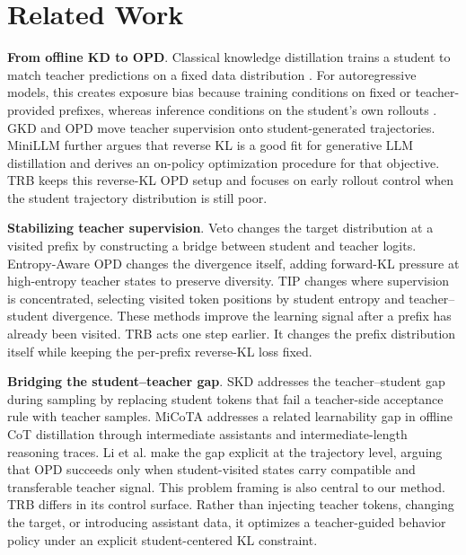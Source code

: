 \documentclass[11pt]{article}
\renewcommand{\paragraph}[1]{\vspace{1mm}\noindent\textbf{#1}.}
\begin{document}
\section{Related Work}
\label{sec:related}

\paragraph{From offline KD to OPD}
Classical knowledge distillation trains a student to match teacher predictions on a fixed data distribution \citep{hinton2015distilling}.
For autoregressive models, this creates exposure bias because training conditions on fixed or teacher-provided prefixes, whereas inference conditions on the student's own rollouts \citep{bengio2015scheduled}.
GKD and OPD \citep{opd} move teacher supervision onto student-generated trajectories.
MiniLLM \citep{gu2023minillm} further argues that reverse KL is a good fit for generative LLM distillation and derives an on-policy optimization procedure for that objective.
TRB keeps this reverse-KL OPD setup and focuses on early rollout control when the student trajectory distribution is still poor.

\paragraph{Stabilizing teacher supervision}
Veto \citep{veto} changes the target distribution at a visited prefix by constructing a bridge between student and teacher logits.
Entropy-Aware OPD \citep{jin2026entropyaware} changes the divergence itself, adding forward-KL pressure at high-entropy teacher states to preserve diversity.
TIP \citep{tip} changes where supervision is concentrated, selecting visited token positions by student entropy and teacher--student divergence.
These methods improve the learning signal after a prefix has already been visited.
TRB acts one step earlier. It changes the prefix distribution itself while keeping the per-prefix reverse-KL loss fixed.

\paragraph{Bridging the student--teacher gap}
SKD \citep{skd} addresses the teacher--student gap during sampling by replacing student tokens that fail a teacher-side acceptance rule with teacher samples.
MiCoTA \citep{ding2025micota} addresses a related learnability gap in offline CoT distillation through intermediate assistants and intermediate-length reasoning traces.
Li et al. \citep{li2026rethinking} make the gap explicit at the trajectory level, arguing that OPD succeeds only when student-visited states carry compatible and transferable teacher signal.
This problem framing is also central to our method.
TRB differs in its control surface. Rather than injecting teacher tokens, changing the target, or introducing assistant data, it optimizes a teacher-guided behavior policy under an explicit student-centered KL constraint.
\end{document}
